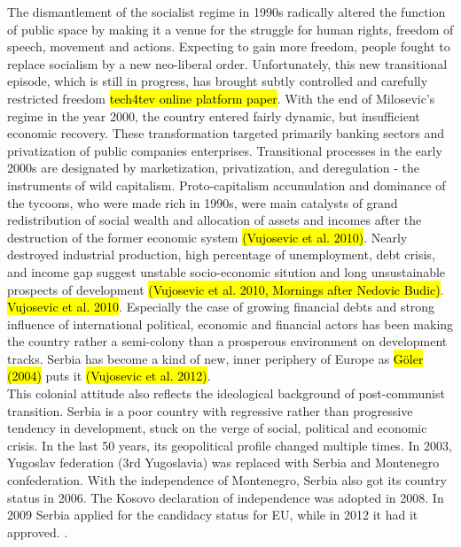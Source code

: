 \documentclass[11pt]{report}
\begin{document}
The dismantlement of the socialist regime in 1990s radically altered the function of public space by making it a venue for the struggle for human rights, freedom of speech, movement and actions. Expecting to gain more freedom, people fought to replace socialism by a new neo-liberal order. Unfortunately, this new transitional episode, which is still in progress, has brought subtly controlled and carefully restricted freedom \hl{tech4tev online platform paper}. With the end of Milosevic's regime in the year 2000, the country entered fairly dynamic, but insufficient economic recovery. These transformation targeted primarily banking sectors and privatization of public companies enterprises. Transitional processes in the early 2000s are designated by marketization, privatization, and deregulation - the instruments of wild capitalism. Proto-capitalism accumulation and dominance of the tycoons, who were made rich in 1990s, were main catalysts of grand redistribution of social wealth and allocation of assets and incomes after the destruction of the former economic system \hl{(Vujosevic et al. 2010)}. Nearly destroyed industrial production, high percentage of unemployment, debt crisis, and income gap suggest unstable socio-economic sitution and long unsustainable prospects of development \hl{(Vujosevic et al. 2010, Mornings after Nedovic Budic)}. \hl{Vujosevic et al. 2010}. Especially the case of growing financial debts and strong influence of international political, economic and financial actors has been making the country rather a semi-colony than a prosperous environment on development tracks. Serbia has become a kind of new, inner periphery of Europe as \hl{Göler (2004)} puts it \hl{(Vujosevic et al. 2012)}.
\\     
This colonial attitude also reflects the ideological background of post-communist transition.
Serbia is a poor country with regressive rather than progressive tendency in development, stuck on the verge of social, political and economic crisis. In the last 50 years, its geopolitical profile changed multiple times.  In 2003, Yugoslav federation (3rd Yugoslavia) was replaced with Serbia and Montenegro confederation. With the independence of Montenegro, Serbia also got its country status in 2006. The Kosovo declaration of independence was adopted in 2008. In 2009 Serbia applied for the candidacy status for EU, while in 2012 it had it approved. .
\end{document}
